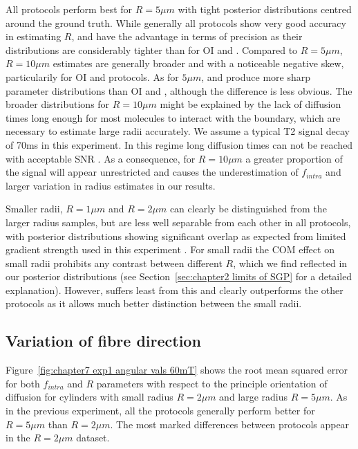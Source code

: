 All protocols perform best for $R=5\mu m$ with tight posterior distributions centred around the ground truth. While generally all protocols show very good accuracy in estimating $R$, {\DO} and {\FD} have the advantage in terms of precision as their distributions are considerably tighter than for {\gls{OI}} and {\SD}. Compared to $R=5\mu m$, $R=10\mu m$ estimates are generally broader and with a noticeable  negative skew, particularily for {\gls{OI}} and {\SD} protocols.  As for $5\mu m$, {\DO} and {\FD} produce more sharp parameter distributions than {\gls{OI}} and {\SD}, although the difference is less obvious. The broader distributions for $R=10\mu m$ might be explained by the lack of diffusion times long enough for most molecules to interact with the boundary, which are necessary to estimate large radii accurately.  We assume a typical T2 signal decay of 70ms in this experiment. In this regime long diffusion times can not be reached with acceptable \gls{SNR} \citep{Zhang:2011a}. As a consequence, for $R=10\mu m$ a greater proportion of the signal will appear unrestricted and causes the underestimation of $f_{intra}$ and larger variation in radius estimates in our results.

Smaller radii, $R=1\mu m$ and $R=2\mu m$ can clearly be distinguished from the larger radius samples, but are less well separable from each other in all protocols, with posterior distributions showing significant overlap as expected from limited gradient strength used in this experiment \citep{Alexander:2008,Alexander:2010,Siow:2012}. For small radii the \gls{COM} effect on small radii prohibits any contrast between different $R$, which we find reflected in our posterior distributions  (see Section~\ref{sec:chapter2 limits of SGP} for a detailed explanation). However, {\FD} suffers least from this and clearly outperforms the other protocols as it allows much better distinction between the small radii.


\subsection{Variation of fibre direction}
Figure~\ref{fig:chapter7 exp1 angular vals 60mT} shows the root mean squared error for both $f_{intra}$ and $R$ parameters with respect to the principle orientation of diffusion for cylinders with small radius $R=2\mu m$ and large radius $R=5\mu m$. As in the previous experiment, all the protocols generally perform better for $R=5\mu m$ than $R=2\mu m$. The most marked differences between protocols appear in the $R=2\mu m$ dataset.


